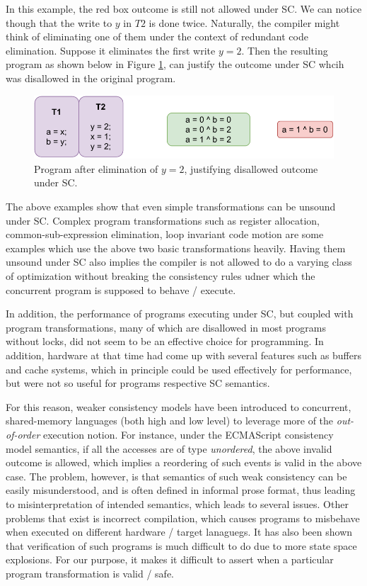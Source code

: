     In this example, the red box outcome is still not allowed under SC. We can notice though that the write to $y$ in $T2$ is done twice. 
    Naturally, the compiler might think of eliminating one of them under the context of redundant code elimination. 
    Suppose it eliminates the first write $y=2$. 
    Then the resulting program as shown below in Figure \ref{intro:Example3(b)}, can justify the outcome under SC whcih was disallowed in the original program.
    \begin{figure}[H]
        \centering
        \includegraphics[scale=0.7]{1.Introduction/SC_Example2(a).pdf}
        \caption{Program after elimination of $y=2$, justifying disallowed outcome under SC.}
        \label{intro:Example3(b)}
    \end{figure}

    The above examples show that even simple transformations can be unsound under SC. Complex program transformations such as register allocation, common-sub-expression elimination, loop invariant code motion are some examples which use the above two basic transformations heavily. 
    Having them unsound under SC also implies the compiler is not allowed to do a varying class of optimization without breaking the consistency rules udner which the concurrent program is supposed to behave / execute. 

    In addition, the performance of programs executing under SC, but coupled with program transformations, many of which are disallowed in most programs without locks, did not seem to be an effective choice for programming. 
    In addition, hardware at that time had come up with several features such as buffers and cache systems, which in principle could be used effectively for performance, but were not so useful for programs respective SC semantics. 
      
    For this reason, weaker consistency models have been introduced to concurrent, shared-memory languages (both high and low level) to leverage more of the \textit{out-of-order} execution notion. 
    For instance, under the ECMAScript consistency model semantics, if all the accesses are of type \textit{unordered}, the above invalid outcome is allowed, which implies a reordering of such events is valid in the above case. 
    The problem, however, is that semantics of such weak consistency can be easily misunderstood, and is often defined in informal prose format, thus leading to misinterpretation of intended semantics, which leads to several issues. 
    Other problems that exist is incorrect compilation, which causes programs to misbehave when executed on different hardware / target lanaguegs. 
    It has also been shown that verification of such programs is much difficult to do due to more state space explosions.
    For our purpose, it makes it difficult to assert when a particular program transformation is valid / safe. 
    
